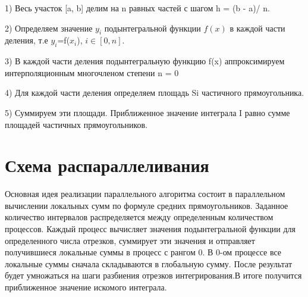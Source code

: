 \documentclass{report}
\begin{document}
\par1) Весь участок [a, b] делим на n равных частей с шагом h = (b - a)/ n.
\par2) Определяем значение $y_i$ подынтегральной функции $f(x)$ в каждой части деления, т.е $y_i$=f($x_i$), $i\in[0, n]$.
\par3) В каждой части деления подынтегральную функцию f(x) аппроксимируем интерполяционным многочленом степени n = 0
\par4) Для каждой части деления определяем площадь S{i} частичного прямоугольника.
\par5) Суммируем эти площади. Приближенное значение интеграла I равно сумме площадей частичных прямоугольников.

\newpage

\section*{Схема распараллеливания}
\par
Основная идея реализации параллельного  алгоритма состоит в параллельном вычислении локальных сумм по формуле средних прямоугольников. 
Заданное количество интервалов распределяется между определенным количеством процессов. Каждый процесс вычисляет значения подынтегральной функции для определенного числа отрезков, суммирует эти значения и отправляет получившиеся локальные суммы в процесс с рангом 0. В 0-ом процессе все локальные суммы сначала складываются в глобальную сумму. После результат будет умножаться на шаги разбиения отрезков интегрирования.В итоге получится приближенное значение искомого интеграла.

\newpage

\end{document}
